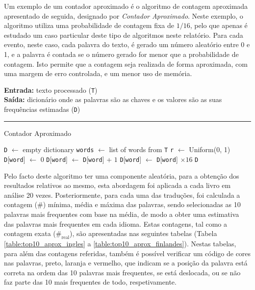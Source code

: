 \documentclass[mirror, portugues]{revdetua}
\begin{document}
Um exemplo de um contador aproximado é o algoritmo de contagem aproximada apresentado de seguida, designado por \textit{Contador Aproximado}. Neste exemplo, o algoritmo utiliza uma probabilidade de contagem fixa de $1/16$, pelo que apenas é estudado um caso particular deste tipo de algoritmos neste relatório. Para cada evento, neste caso, cada palavra do texto, é gerado um número aleatório entre 0 e 1, e a palavra é contada se o número gerado for menor que a probabilidade de contagem. Isto permite que a contagem seja realizada de forma aproximada, com uma margem de erro controlada, e um menor uso de memória.

\begin{algorithm}[H]
\raggedright
\textbf{Entrada:} texto processado (\texttt{T}) \\
\textbf{Saída:} dicionário onde as palavras são as chaves e os valores são as suas frequências estimadas (\texttt{D})\\
\hrule 
\caption{Contador Aproximado}
\begin{algorithmic}[1]
    \State \texttt{D} $\gets$ empty dictionary
    \State \texttt{words} $\gets$ list of words from \texttt{T}
    \State \texttt{r} $\gets$ Uniform(0, 1)
            \State \texttt{D}[\texttt{word}] $\gets$ 0
        \EndIf
        \State \texttt{D}[\texttt{word}] $\gets$ \texttt{D}[\texttt{word}] + $1$
    \EndIf
    \EndFor
     
    \State \texttt{D}[\texttt{word}] $\gets$ \texttt{D}[\texttt{word}] $\times 16$
    \EndFor
    \State \Return \texttt{D}
\end{algorithmic}
\end{algorithm}

Pelo facto deste algoritmo ter uma componente aleatória, para a obtenção dos resultados relativos ao mesmo, esta abordagem foi aplicada a cada livro em análise 20 vezes. Posteriormente, para cada uma das traduções, foi calculada a contagem (\#) mínima, média e máxima das palavras, sendo selecionadas as 10 palavras mais frequentes com base na média, de modo a obter uma estimativa das palavras mais frequentes em cada idioma. Estas contagens, tal como a contagem exata ($\text{\#}_\text{real}$), são apresentadas nas seguintes tabelas (Tabela \ref{table:top10_aprox_ingles} a \ref{table:top10_aprox_finlandes}). Nestas tabelas, para além das contagens referidas, também é possível verificar um código de cores nas palavras, preto, laranja e vermelho, que indicam se a posição da palavra está correta na ordem das 10 palavras mais frequentes, se está deslocada, ou se não faz parte das 10 mais frequentes de todo, respetivamente.
\end{document}
